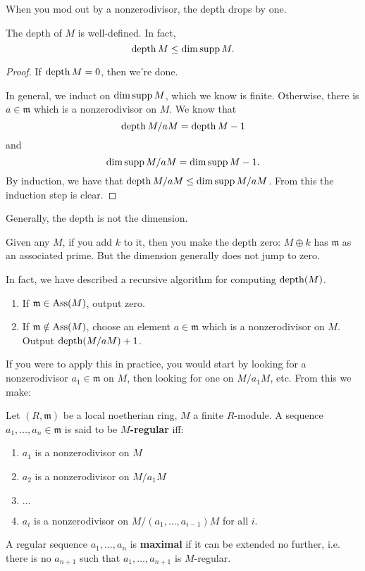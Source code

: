 When you mod out by a nonzerodivisor, the depth drops by one.

\begin{corollary}
The depth of $M$ is well-defined. In fact,
\[ \operatorname{depth} M \leq \dim \operatorname{supp} M.  \]
\end{corollary}
\begin{proof}
If $\operatorname{depth} M = 0$, then we're done.

In general, we induct on $\dim \operatorname{supp} M$, which we know is
finite. Otherwise,
there is $ a \in \mathfrak{m}$ which is a nonzerodivisor on $M$.
We know that
\[ \operatorname{depth} M/aM = \operatorname{depth} M -1  \]
and
\[ \dim \operatorname{supp} M/aM = \dim \operatorname{supp} M -1.  \]
By induction, we have that $\operatorname{depth} M/aM \leq \dim \operatorname{supp} M/aM$.
From this the
induction step is clear.
\end{proof}

Generally, the depth is not the dimension.
\begin{example}
Given any $M$, if you add $k$ to it, then you make the depth
zero: $M \oplus k$
has $\mathfrak{m}$ as an associated prime. But the dimension
generally does not
jump to zero.
\end{example}

In fact, we have described a recursive algorithm for computing
$\operatorname{depth}(M)$.
\begin{enumerate}
\item If $\mathfrak{m}  \in \operatorname{Ass}(M)$, output zero.
\item If $\mathfrak{m} \notin \operatorname{Ass}(M)$, choose an element $a
\in\mathfrak{m}$
which is a nonzerodivisor on $M$. Output $\operatorname{depth}(M/aM) +1$.
\end{enumerate}


If you were to apply this in practice, you would start by
looking for a
nonzerodivisor $a_1 \in \mathfrak{m}$ on $M$, then looking for
one on $M/a_1
M$, etc.
From this we make:

\begin{definition}
Let $(R, \mathfrak{m})$ be a local noetherian ring, $M$ a finite
$R$-module. A
sequence $a_1, \dots, a_n \in \mathfrak{m}$ is said to be
\textbf{$M$-regular} iff:
\begin{enumerate}
\item $a_1$ is a nonzerodivisor on $M$
\item $a_2$ is a nonzerodivisor on $M/a_1 M$
\item  $\dots$
\item $a_i$ is a nonzerodivisor on $M/(a_1, \dots, a_{i-1})M$
for all $i$.
\end{enumerate}
A regular sequence $a_1, \dots, a_n$ is \textbf{maximal } if it
can be extended
no further, i.e. there is no $a_{n+1}$ such that $a_1, \dots,
a_{n+1}$ is
$M$-regular.
\end{definition}

